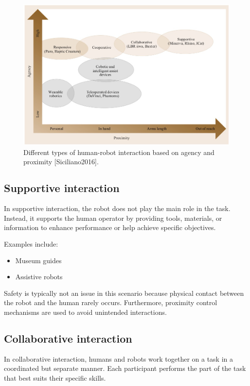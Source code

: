 \begin{figure}[H]
  \centering
  \includegraphics[width=\linewidth]{imgs/hri_interaction_types.png}
  \caption{Different types of human-robot interaction based on agency and proximity [Siciliano2016].}
\end{figure}

\hfill

\subsection{Supportive interaction}

In supportive interaction, the robot does not play the main role in the task. Instead, it supports the human operator by providing tools, materials, or information to enhance performance or help achieve specific objectives.

Examples include:
\begin{itemize}
  \item Museum guides
  \item Assistive robots
\end{itemize}

Safety is typically not an issue in this scenario because physical contact between the robot and the human rarely occurs. Furthermore, proximity control mechanisms are used to avoid unintended interactions.

\hfill

\subsection{Collaborative interaction}

In collaborative interaction, humans and robots work together on a task in a coordinated but separate manner. Each participant performs the part of the task that best suits their specific skills.

